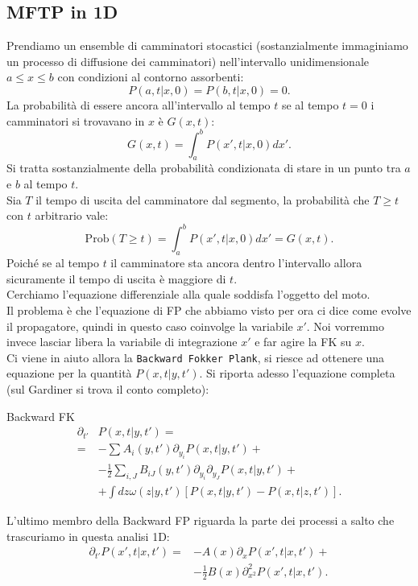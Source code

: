 \subsection{MFTP in 1D}%
\label{sub:MFTP in 1D}
Prendiamo un ensemble di camminatori stocastici (sostanzialmente immaginiamo un processo di diffusione dei camminatori) nell'intervallo unidimensionale $a\le x \le b$ con condizioni al contorno assorbenti:
\[
    P\left(a,t|x,0\right) = P\left(b,t|x,0\right)=0 
.\] 
La probabilità di essere ancora all'intervallo al tempo $t$ se al tempo $t=0$ i camminatori si trovavano in $x$ è $G(x,t)$:
\[
    G(x,t) = \int_{a}^{b} P(x',t|x, 0) dx' 
.\] 
Si tratta sostanzialmente della probabilità condizionata di stare in un punto tra $a$ e $b$ al tempo $t$.\\
Sia $T$ il tempo di uscita del camminatore dal segmento, la probabilità che $T\ge t$ con $t$ arbitrario vale:
\[
    \text{Prob}(T\ge t) = \int_{a}^{b} P\left(x',t|x,0\right)dx' = G(x,t)  
.\] 
Poiché se al tempo $t$  il camminatore sta ancora dentro l'intervallo allora sicuramente il tempo di uscita è maggiore di $t$.\\
Cerchiamo l'equazione differenziale alla quale soddisfa l'oggetto del moto. \\
Il problema è che l'equazione di FP che abbiamo visto per ora ci dice come evolve il propagatore, quindi in questo caso coinvolge la variabile $x'$. 
Noi vorremmo invece lasciar libera la variabile di integrazione $x'$ e far agire la FK su $x$. \\
Ci viene in aiuto allora la \texttt{Backward Fokker Plank}, si riesce ad ottenere una equazione per la quantità $P\left(x,t|y,t'\right)$. Si riporta adesso l'equazione completa (sul Gardiner si trova il conto completo):
\begin{redbox}{Backward FK}
\[\begin{aligned}
     \partial_{t'}&P\left(x,t|y,t'\right) = \\
    = & - \sum_{}^{} A_i(y,t') \partial_{y_i}P\left(x,t|y,t'\right) +\\
      & - \frac{1}{2}\sum_{i,J}^{} B_{iJ}(y,t') \partial_{y_i}\partial_{y_J}P\left(x,t|y,t'\right) + \\
      & + \int dz \omega\left(z|y,t'\right)\left[P\left(x,t|y,t'\right)-P\left(x,t|z,t'\right)\right]
.\end{aligned}\]    
\end{redbox}
\noindent
L'ultimo membro della Backward FP riguarda la parte dei processi a salto che trascuriamo in questa analisi 1D:
\[\begin{aligned}
    \partial_{t'}P\left(x',t|x,t'\right) = & -A(x) \partial_{x}P\left(x',t|x,t'\right) +\\
					   &-\frac{1}{2}B(x) \partial^2_{x^2}P\left(x',t|x,t'\right)
.\end{aligned}\]
